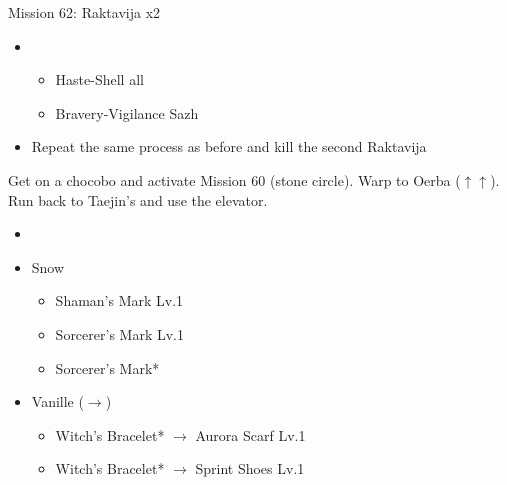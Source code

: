 \begin{battle}{Mission 62: Raktavija x2}
\begin{itemize}
			\begin{itemize}
				\item Blitz-Blitz
				\item Repeat, refreshing with [2] until the first Raktavija is dead 
			\end{itemize}
		\item \fifth
			\begin{itemize}
				\item Haste-Shell all
				\item Bravery-Vigilance Sazh
			\end{itemize}
		\item Repeat the same process as before and kill the second Raktavija
	\end{itemize}
\end{battle}

Get on a chocobo and activate Mission 60 (stone circle).
Warp to Oerba ($\uparrow\uparrow$).
Run back to Taejin's and use the elevator.

\begin{menu}
	\begin{itemize}
	\paradigm
		\begin{itemize}
			\item {}%
				{\paradigmline{\com}{(\com)}{(\com)}}%
				{\paradigmline{(\rav)}{\rav}{\med}}%
				{\paradigmline{(\com)}{(\com)}{\med}}%
				{\paradigmline{\com}{\sen}{\med}}%
				{\paradigmline{\syn}{\sen}{(\sab)}}%
				{\paradigmline[4]{\rav}{\rav}{\sab}}%
		\end{itemize}
	\equip
		\begin{itemize}
			\item Snow
				\begin{itemize}
					\item Shaman's Mark Lv.1
					\item Sorcerer's Mark Lv.1
					\item Sorcerer's Mark*
				\end{itemize}
			\item Vanille ($\rightarrow$)
				\begin{itemize}
					\item Witch's Bracelet* $\rightarrow$ Aurora Scarf Lv.1
					\item Witch's Bracelet* $\rightarrow$ Sprint Shoes Lv.1
				\end{itemize}
		\end{itemize}
	\end{itemize}
\end{menu}

